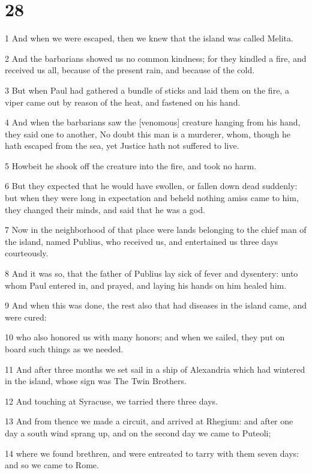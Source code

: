 \chapter{28}

\par 1 And when we were escaped, then we knew that the island was called Melita.
\par 2 And the barbarians showed us no common kindness; for they kindled a fire, and received us all, because of the present rain, and because of the cold.
\par 3 But when Paul had gathered a bundle of sticks and laid them on the fire, a viper came out by reason of the heat, and fastened on his hand.
\par 4 And when the barbarians saw the [venomous] creature hanging from his hand, they said one to another, No doubt this man is a murderer, whom, though he hath escaped from the sea, yet Justice hath not suffered to live.
\par 5 Howbeit he shook off the creature into the fire, and took no harm.
\par 6 But they expected that he would have swollen, or fallen down dead suddenly: but when they were long in expectation and beheld nothing amiss came to him, they changed their minds, and said that he was a god.
\par 7 Now in the neighborhood of that place were lands belonging to the chief man of the island, named Publius, who received us, and entertained us three days courteously.
\par 8 And it was so, that the father of Publius lay sick of fever and dysentery: unto whom Paul entered in, and prayed, and laying his hands on him healed him.
\par 9 And when this was done, the rest also that had diseases in the island came, and were cured:
\par 10 who also honored us with many honors; and when we sailed, they put on board such things as we needed.
\par 11 And after three months we set sail in a ship of Alexandria which had wintered in the island, whose sign was The Twin Brothers.
\par 12 And touching at Syracuse, we tarried there three days.
\par 13 And from thence we made a circuit, and arrived at Rhegium: and after one day a south wind sprang up, and on the second day we came to Puteoli;
\par 14 where we found brethren, and were entreated to tarry with them seven days: and so we came to Rome.
